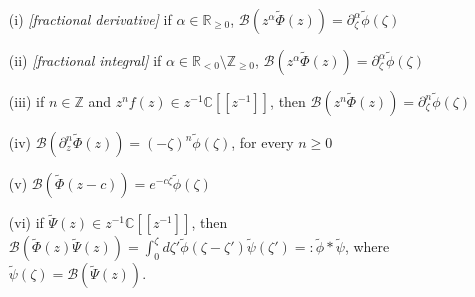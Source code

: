 \documentclass{article}
\newcommand{\Z}{\mathbb{Z}}
\newcommand{\R}{\mathbb{R}}
\newcommand{\C}{\mathbb{C}}
\begin{document}
\begin{itemize}
\item[(i)] \emph{[fractional derivative]} if $\alpha\in\R_{\geq 0}$, $\mathcal{B}\left(z^\alpha \tilde{\Phi}(z)\right)=\partial_{\zeta}^{\alpha}\tilde{\phi}(\zeta)$
\item[(ii)] \emph{[fractional integral]} if $\alpha\in\R_{<0}\setminus\Z_{\geq 0}$, $\mathcal{B}\left(z^\alpha \tilde{\Phi}(z)\right)=\partial_{\zeta}^{\alpha}\tilde{\phi}(\zeta)$
\item[(iii)] if $n\in\Z$ and $z^nf(z)\in z^{-1}\C[\![z^{-1}]\!]$, then $\mathcal{B}(z^n\tilde{\Phi}(z))=\partial_\zeta^n\tilde{\phi}(\zeta)$ 
\item[(iv)] $\mathcal{B}\left(\partial_z^{n} \tilde{\Phi}(z)\right)=(-\zeta)^n\tilde{\phi}(\zeta)$, for every $n\geq 0$
\item[(v)] $\mathcal{B}(\tilde{\Phi}(z-c))=e^{-c\zeta}\tilde{\phi}(\zeta)$
\item[(vi)] if $\tilde{\Psi}(z)\in z^{-1}\C[\![z^{-1}]\!]$, then $\mathcal{B}(\tilde{\Phi}(z)\tilde{\Psi}(z))=\int_0^{\zeta}d\zeta' \tilde{\phi}(\zeta-\zeta')\tilde{\psi}(\zeta')=:\tilde{\phi}\ast \tilde{\psi}$, where $\tilde{\psi}(\zeta)=\mathcal{B}(\tilde{\Psi}(z))$.
\end{itemize} 
\end{document}
